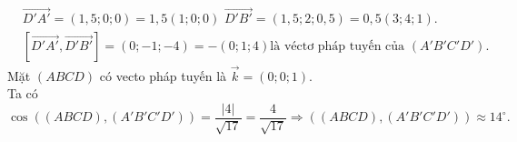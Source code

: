 \begin{bt}
{		 $$
		\begin{aligned}
			& \overrightarrow{D'A'}=(1{,}5; 0; 0)=1{,}5(1;  0; 0)\,\, \overrightarrow{D'B'}=(1{,}5; 2; 0{,}5)=0{,}5(3; 4; 1) . \\& \left[\overrightarrow{D'A'}, \overrightarrow{D' B'}\right]=(0;-1;-4)=-(0; 1; 4) \text {là véctơ pháp tuyến của }\left(A' B'C'D'\right).
		\end{aligned}
		$$ 
		Mặt $(A B C D)$ có vecto pháp tuyến là $\overrightarrow{k}=(0; 0;  1)$.\\
		Ta có$ 
		\cos \left((A B C D),\left(A' B'C'D'\right)\right)=\dfrac{|4|}{\sqrt{17}}=\dfrac{4}{\sqrt{17}}  \Rightarrow\left((A B C D),\left(A'B'C'D'\right)\right) \approx 14^{\circ}. $
	 }
\end{bt}

